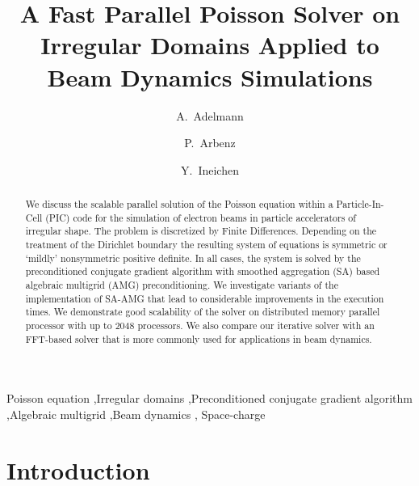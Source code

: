 \documentclass[a4paper,10pt,3p,final,pdftex]{elsarticle}
\begin{document}
\begin{frontmatter}

\title{A Fast Parallel Poisson Solver on Irregular Domains Applied to Beam
  Dynamics Simulations}

\author[psi]{A.~Adelmann}

\author[eth]{P.~Arbenz}

\author[psi,eth]{Y.~Ineichen}

\address[psi]{Paul Scherrer Institut, CH-5234 Villigen, Switzerland}
\address[eth]{ETH Z\"urich, Chair of Computational Science,
  Universit\"atsstrasse 6, CH-8092 Z\"urich, Switzerland}




\begin{abstract}
  We discuss the scalable parallel solution of the Poisson equation
  within a Particle-In-Cell (PIC) code for the simulation of electron
  beams in particle accelerators of irregular shape.  The problem is
  discretized by Finite Differences.  Depending on the treatment of the
  Dirichlet boundary the resulting system of equations is symmetric or
  `mildly' nonsymmetric positive definite.  In all cases, the system is
  solved by the preconditioned conjugate gradient algorithm with
  smoothed aggregation (SA) based algebraic multigrid (AMG)
  preconditioning.  We investigate variants of the implementation of
  SA-AMG that lead to considerable improvements in the execution times.
  We demonstrate good scalability of the solver on distributed memory
  parallel processor with up to 2048 processors.  We also compare our
  iterative solver with an FFT-based solver that is more commonly used
  for applications in beam dynamics.
\end{abstract}

\begin{keyword}
  Poisson equation \sep Irregular domains \sep Preconditioned conjugate
  gradient algorithm \sep Algebraic multigrid \sep Beam dynamics \sep
  Space-charge
\end{keyword}

\end{frontmatter}

\nocite{*}
 
\section{Introduction}
\label{sec:intro}
\end{document}
